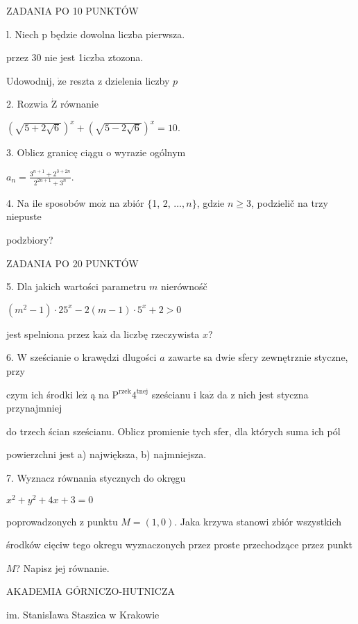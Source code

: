 \documentclass[a4paper,12pt]{article}
\begin{document}
ZADANIA PO 10 PUNKTÓW

l. Niech p będzie dowolna liczba pierwsza.

przez 30 nie jest 1iczba ztozona.

Udowodnij, $\dot{\mathrm{z}}\mathrm{e}$ reszta z dzielenia liczby $p$

2. Rozwia $\dot{\mathrm{Z}}$ równanie

$(\sqrt{5+2\sqrt{6}})^{x}+(\sqrt{5-2\sqrt{6}})^{x}=10.$

3. Oblicz granicę ciągu o wyrazie ogólnym

$a_{n}=\displaystyle \frac{3^{n+1}+2^{3+2n}}{2^{2n+1}+3^{n}}.$

4. Na ile sposobów $\mathrm{m}\mathrm{o}\dot{\mathrm{z}}$ na zbiór $\{$1, 2, $\ldots, n\}$, gdzie $n\geq 3$, podzielič na trzy niepuste

podzbiory?

ZADANIA PO 20 PUNKTÓW

5. Dla jakich wartości parametru $m$ nierównośč

$(m^{2}-1)\cdot 25^{x}-2(m-1)\cdot 5^{x}+2>0$

jest spelniona przez $\mathrm{k}\mathrm{a}\dot{\mathrm{z}}$ da liczbę rzeczywista $x$?

6. $\mathrm{W}$ sześcianie o krawędzi dlugości $a$ zawarte sa dwie sfery zewnętrznie styczne, przy

czym ich środki $\mathrm{l}\mathrm{e}\dot{\mathrm{z}}$ ą na $\mathrm{P}^{\mathrm{r}\mathrm{z}\mathrm{e}\mathrm{k}}4^{\mathrm{t}\mathrm{n}\mathrm{e}\mathrm{j}}$ sześcianu i $\mathrm{k}\mathrm{a}\dot{\mathrm{z}}$ da z nich jest styczna przynajmniej

do trzech ścian sześcianu. Oblicz promienie tych sfer, dla których suma ich pól

powierzchni jest a) największa, b) najmniejsza.

7. Wyznacz równania stycznych do okręgu

$x^{2}+y^{2}+4x+3=0$

poprowadzonych z punktu $M = (1,0)$. Jaka krzywa stanowi zbiór wszystkich

środków cięciw tego okregu wyznaczonych przez proste przechodzące przez punkt

$M$? Napisz jej równanie.






AKADEMIA GÓRNICZO-HUTNICZA

im. StanisIawa Staszica w Krakowie
\end{document}
